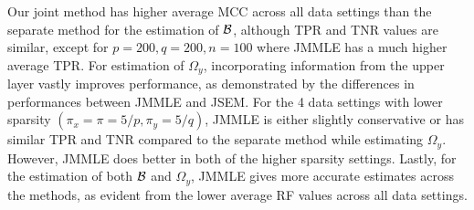 Our joint method has higher average MCC across all data settings than the separate method for the estimation of ${\cal{B}}$, although TPR and TNR values are similar, except for $p=200, q=200, n=100$ where JMMLE has a much higher average TPR. For estimation of $\Omega_y$, incorporating information from the upper layer vastly improves performance, as demonstrated by the differences in performances between JMMLE and JSEM. For the 4 data settings with lower sparsity $(\pi_x = \pi = 5/p, \pi_y = 5/q)$, JMMLE is either slightly conservative or has similar TPR and TNR compared to the separate method while estimating $\Omega_y$. However, JMMLE does better in both of the higher sparsity settings. Lastly, for the estimation of both ${\cal{B}}$ and $\Omega_y$, JMMLE gives more accurate estimates across the methods, as evident from the lower average RF values across all data settings.
%


